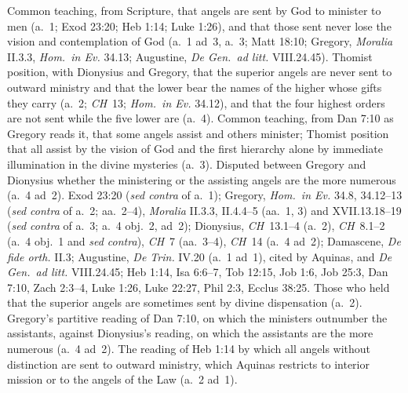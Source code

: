  {Common teaching, from Scripture, that angels are sent by God to
 minister to men (a.~1; Exod 23:20; Heb 1:14; Luke 1:26), and that those
 sent never lose the vision and contemplation of God (a.~1 ad~3, a.~3;
 Matt 18:10; Gregory, \emph{Moralia} II.3.3, \emph{Hom.\ in Ev.} 34.13;
 Augustine, \emph{De Gen.\ ad litt.} VIII.24.45). Thomist position, with Dionysius and Gregory, that the
 superior angels are never sent to outward ministry and that the lower
 bear the names of the higher whose gifts they carry (a.~2; \emph{CH}~13;
 \emph{Hom.\ in Ev.} 34.12), and that the four highest orders are not sent
 while the five lower are (a.~4). Common teaching, from Dan 7:10 as
 Gregory reads it, that some angels assist and others minister; Thomist
 position that all assist by the vision of God and the first hierarchy
 alone by immediate illumination in the divine mysteries (a.~3).
 Disputed between Gregory and Dionysius whether the ministering or the
 assisting angels are the more numerous (a.~4 ad~2).}
 {Exod 23:20 (\emph{sed contra} of a.~1); Gregory, \emph{Hom.\ in Ev.}
 34.8, 34.12--13 (\emph{sed contra} of a.~2; aa.~2--4), \emph{Moralia}
 II.3.3, II.4.4--5 (aa.~1, 3) and XVII.13.18--19 (\emph{sed contra} of
 a.~3; a.~4 obj.~2, ad~2); Dionysius, \emph{CH}~13.1--4 (a.~2), \emph{CH}~8.1--2 (a.~4 obj.~1 and \emph{sed contra}), \emph{CH}~7 (aa.~3--4),
 \emph{CH}~14 (a.~4 ad~2); Damascene, \emph{De fide orth.} II.3; Augustine,
 \emph{De Trin.} IV.20 (a.~1 ad~1), cited by Aquinas, and \emph{De Gen.\ ad
 litt.} VIII.24.45; Heb 1:14, Isa 6:6--7, Tob 12:15, Job 1:6,
 Job 25:3, Dan 7:10, Zach 2:3--4, Luke 1:26, Luke 22:27, Phil 2:3, Ecclus
 38:25.}
 {Those who held that the superior angels are sometimes sent by divine
 dispensation (a.~2). Gregory's partitive reading of Dan 7:10, on which the
 ministers outnumber the assistants, against Dionysius's reading, on which
 the assistants are the more numerous (a.~4 ad~2). The reading of Heb 1:14
 by which all angels without distinction are sent to outward ministry,
 which Aquinas restricts to interior mission or to the angels of the Law
 (a.~2 ad~1).}
